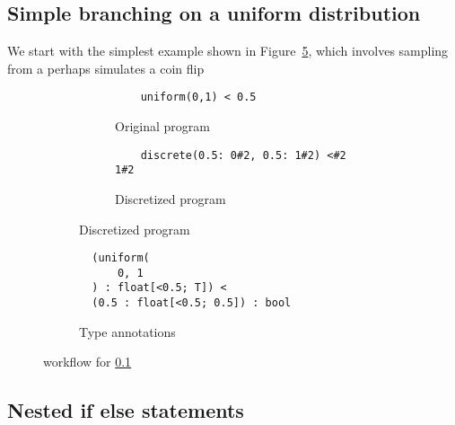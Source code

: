\documentclass[acmsmall,screen,dvipsnames,x11names,nonacm,anonymous,review]{acmart}
\newcommand{\Slice}{\text{\scshape Slice}\xspace}
\begin{document}
\subsection{Simple branching on a uniform distribution}
\label{sec:simple-branch}
We start with the simplest example shown in Figure~\ref{fig:simple-branch}, which involves sampling from a 
perhaps simulates a coin flip


\begin{figure}[ht]
\centering
\begin{subfigure}[t]{0.45\textwidth}
  \centering
  \begin{subfigure}[t]{\textwidth}
    \begin{lstlisting}
    uniform(0,1) < 0.5
    \end{lstlisting}
    \caption{Original program}
    \label{fig:simple-branch-orig}
  \end{subfigure}

  \vspace{1em} %

  \begin{subfigure}[t]{\textwidth}
    \begin{lstlisting}
    discrete(0.5: 0#2, 0.5: 1#2) <#2 1#2
    \end{lstlisting}
    \caption{Discretized program}
    \label{fig:simple-branch-discr}
  \end{subfigure}
\end{subfigure}
\hfill
\begin{subfigure}[t]{0.45\textwidth}
  \begin{lstlisting}
  (uniform(
      0, 1
  ) : float[<0.5; T]) < 
  (0.5 : float[<0.5; 0.5]) : bool
  \end{lstlisting}
  \caption{Type annotations}
  \label{fig:simple-branch-types}
\end{subfigure}

\caption{\Slice workflow for \ref{sec:simple-branch}}
\label{fig:simple-branch}
\end{figure}


\subsection{Nested if else statements}
\label{sec:nested-if}
\end{document}
